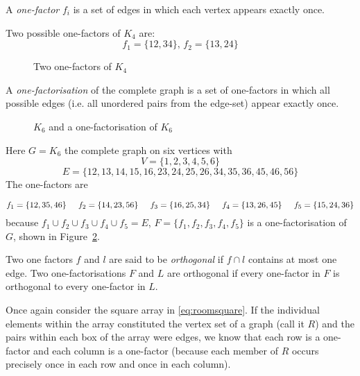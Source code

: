 A \emph{one-factor} $f_i$ is a set of edges in which each vertex appears exactly once.

\begin{example}
Two possible one-factors of $K_4$ are:
$$f_1 = \{12,34\},\, f_2 = \{13,24\}$$
\end{example}

\begin{figure}
  \centering
  
  \caption{Two one-factors of $K_{4}$}
  \label{fig:two-one-factors}
\end{figure}

A \emph{one-factorisation} of the complete graph is a set of one-factors in which all possible edges (i.e. all unordered pairs from the edge-set) appear exactly once.

\begin{figure}
  \centering
  
  \caption{$K_{6}$ and a one-factorisation of $K_{6}$}
  \label{fig:k6-factorisation}
\end{figure}

\begin{example}
Here
$G = K_6$
the complete graph on six vertices with
$$V = \{1, 2, 3, 4, 5, 6\}$$
$$E = \{12, 13, 14, 15, 16, 23, 24, 25, 26, 34, 35, 36, 45, 46, 56\}$$
The one-factors are

$$
f_1 = \{12, 35, 46\} \hspace{0.5cm}
f_2 = \{14, 23, 56\} \hspace{0.5cm}
f_3 = \{16, 25, 34\} \hspace{0.5cm}
f_4 = \{13, 26, 45\} \hspace{0.5cm} 
f_5 = \{15, 24, 36\}
$$
because
$f_1 \cup f_2 \cup f_3 \cup f_4 \cup f_5 = E$,
$F = \{f_1, f_2, f_3, f_4, f_5\}$
is a one-factorisation of
$G$,
shown in Figure~\ref{fig:k6-factorisation}.
\end{example}

Two one factors $f$ and $l$ are said to be \emph{orthogonal} if $f \cap l$ contains at most one edge.
Two one-factorisations $F$ and $L$ are orthogonal if every one-factor in $F$ is orthogonal to every one-factor in $L$.

Once again consider the square array in \eqref{eq:roomsquare}.
If the individual elements within the array constituted the vertex set of a graph (call it $R$) and the pairs within each box of the array were edges, we know that each row is a one-factor and each column is a one-factor (because each member of $R$ occurs precisely once in each row and once in each column).

